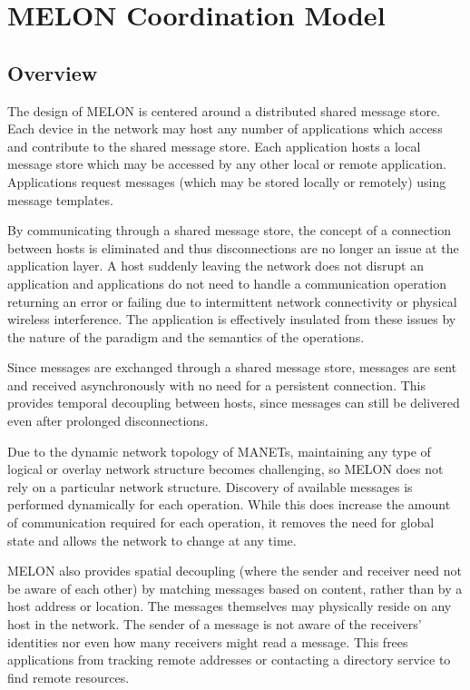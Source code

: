 \chapter{MELON Coordination Model}\label{chapter:model}

\section{Overview}

The design of MELON is centered around a distributed shared message store. Each device in the network may host any number of applications which access and contribute to the shared message store. Each application hosts a local message store which may be accessed by any other local or remote application. Applications request messages (which may be stored locally or remotely) using message templates.

By communicating through a shared message store, the concept of a connection between hosts is eliminated and thus disconnections are no longer an issue at the application layer. A host suddenly leaving the network does not disrupt an application and applications do not need to handle a communication operation returning an error or failing due to intermittent network connectivity or physical wireless interference. The application is effectively insulated from these issues by the nature of the paradigm and the semantics of the operations.

Since messages are exchanged through a shared message store, messages are sent and received asynchronously with no need for a persistent connection. This provides temporal decoupling between hosts, since messages can still be delivered even after prolonged disconnections.

Due to the dynamic network topology of MANETs, maintaining any type of logical or overlay network structure becomes challenging, so MELON does not rely on a particular network structure. Discovery of available messages is performed dynamically for each operation. While this does increase the amount of communication required for each operation, it removes the need for global state and allows the network to change at any time.

MELON also provides spatial decoupling (where the sender and receiver need not be aware of each other) by matching messages based on content, rather than by a host address or location. The messages themselves may physically reside on any host in the network. The sender of a message is not aware of the receivers' identities nor even how many receivers might read a message. This frees applications from tracking remote addresses or contacting a directory service to find remote resources.

